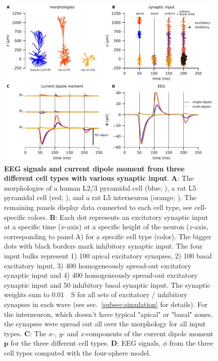 \documentclass[preprint,10pt,authoryear]{elsarticle}
\newcommand{\newtxt}[1]{{\color{Red}#1}}
\begin{document}
\begin{figure}[H]
	\centering
	\includegraphics[width=1.\textwidth]{figure3}
	\caption{\textbf{EEG signals and current dipole moment from three different cell types with various synaptic input}.
		\textbf{A}: The morphologies of a human L2/3 pyramidal cell (\newtxt{blue}; \cite{EYAL2016}), a rat L5 pyramidal cell (\newtxt{red}; \cite{HAY2011}), and a rat L5 interneuron (\newtxt{orange}; \cite{MARKRAM2015}). The remaining panels display data connected to each cell type, see cell-specific colors.
		\textbf{B}: Each dot represents an excitatory synaptic input at a specific time ($x$-axis) at a specific height of the neuron ($z$-axis, corresponding to panel A) for a specific cell type (color). The \newtxt{bigger dots with black borders} mark inhibitory synaptic input. The four input bulks represent 1) 100 apical excitatory synapses, 2) 100 basal excitatory input, 3) 400 homogeneously spread-out excitatory synaptic input and 4) 400 homogeneously spread-out excitatory synaptic input and 50 inhibitory basal synaptic input. The synaptic weights sum to 0.01~\si{\mu S} for all sets of excitatory / inhibitory synapses in each wave (see sec.~\ref{subsec:simulation} for details). For the interneuron, which doesn't have typical "apical" or "basal" zones, the synapses were spread out all over the morphology for all input types.
		\textbf{C}: The $x$-, $y$- and $z$-components of the current dipole moment $\mathbf{p}$ for the three different cell types.
		\textbf{D}: EEG signals, $\phi$ from the three cell types computed with the four-sphere model.
	}
	\label{fig:eeg_compare_cell_types}
\end{figure}
\end{document}
